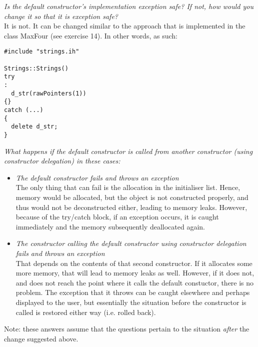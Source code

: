 \textit{Is the default constructor's implementation exception safe? If not, how would you change it so that it is exception safe?} \\
It is not. It can be changed similar to the approach that is implemented in the class MaxFour (see exercise 14). In other words, as such: \\
\begin{lstlisting}[style=in, caption=c\_strings.cc]
#include "strings.ih"

Strings::Strings()
try
:
  d_str(rawPointers(1))
{}
catch (...)
{
  delete d_str;
}
\end{lstlisting}

\textit{What happens if the default constructor is called from another constructor (using constructor delegation) in these cases:}

\begin{itemize}
  \item \textit{The default constructor fails and throws an exception} \\
    The only thing that can fail is the allocation in the initialiser list. Hence, memory would be allocated, but the object is not constructed properly, and thus would not be deconstructed either, leading to memory leaks. However, because of the try/catch block, if an exception occurs, it is caught immediately and the memory subsequently deallocated again.
  \item \textit{The constructor calling the default constructor using constructor delegation fails and throws an exception} \\
    That depends on the contents of that second constructor. If it allocates some more memory, that will lead to memory leaks as well. However, if it does not, and does not reach the point where it calls the default constuctor, there is no problem. The exception that it throws can be caught elsewhere and perhaps displayed to the user, but essentially the situation before the constructor is called is restored either way (i.e. rolled back).
\end{itemize}

Note: these answers assume that the questions pertain to the situation \textit{after} the change suggested above.
